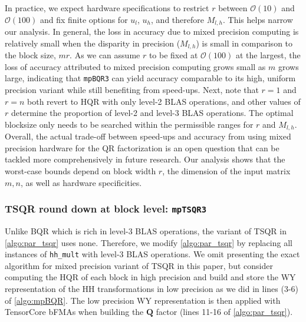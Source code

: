 \documentclass[review,onefignum,onetabnum]{siamart190516}
\newcommand{\bb}[1]{\mathbf{#1}}
\newcommand{\cO}{\mathcal{O}}
\begin{document}
In practice, we expect hardware specifications to restrict $r$ between $\cO(10)$ and $\cO(100)$ and fix finite options for $u_l$, $u_h$, and therefore $M_{l,h}$.
This helps narrow our analysis. 
In general, the loss in accuracy due to mixed precision computing is relatively small when the disparity in precision ($M_{l,h}$) is small in comparison to the block size, $mr$.
As we can assume $r$ to be fixed at $\cO(100)$ at the largest, the loss of accuracy attributed to mixed precision computing grows small as $m$ grows large, indicating that {\tt mpBQR3} can yield accuracy comparable to its high, uniform precision variant while still benefiting from speed-ups. 
Next, note that $r=1$ and $r=n$ both revert to HQR with only level-2 BLAS operations, and other values of $r$ determine the proportion of level-2 and level-3 BLAS operations.
The optimal blocksize only needs to be searched within the permissible ranges for $r$ and $M_{l,h}$.
Overall, the actual trade-off between speed-ups and accuracy from using mixed precision hardware for the QR factorization is an open question that can be tackled more comprehensively in future research.
Our analysis shows that the worst-case bounds depend on block width $r$, the dimension of the input matrix $m,n$, as well as hardware specificities. 

\subsubsection{TSQR round down at block level: {\tt mpTSQR3}}\label{sec:mp-3t}
Unlike BQR which is rich in level-3 BLAS operations, the variant of TSQR in \cref{algo:par_tsqr} uses none.
Therefore, we modify \cref{algo:par_tsqr} by replacing all instances of {\tt hh\_mult} with level-3 BLAS operations.
We omit presenting the exact algorithm for mixed precision variant of TSQR in this paper, but consider computing the HQR of each block in high precision and build and store the WY representation of the HH transformations in low precision as we did in lines (3-6) of \cref{algo:mpBQR}.
The low precision WY representation is then applied with TensorCore bFMAs when building the $\bb{Q}$ factor (lines 11-16 of \cref{algo:par_tsqr}).
\end{document}
